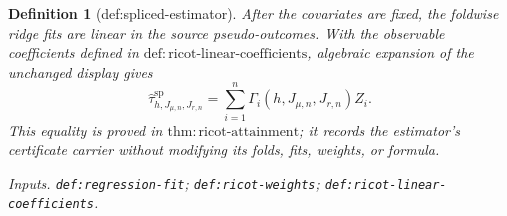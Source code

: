 \documentclass{article}
\newtheorem{definition}{Definition}
\begin{document}
\begin{definition}[def:spliced-estimator]
After the covariates are fixed, the foldwise ridge fits are linear in the source pseudo-outcomes. With the observable coefficients defined in \(\mathrm{def:ricot\text{-}linear\text{-}coefficients}\), algebraic expansion of the unchanged display gives
\[
\widehat\tau^{\mathrm{sp}}_{h,J_{\mu,n},J_{r,n}}=\sum_{i=1}^n\Gamma_i(h,J_{\mu,n},J_{r,n})Z_i.
\]
This equality is proved in \(\mathrm{thm:ricot\text{-}attainment}\); it records the estimator's certificate carrier without modifying its folds, fits, weights, or formula.
\par\smallskip\noindent\emph{Inputs.} \texttt{def:\allowbreak{}regression-\allowbreak{}fit}; \texttt{def:\allowbreak{}ricot-\allowbreak{}weights}; \texttt{def:\allowbreak{}ricot-\allowbreak{}linear-\allowbreak{}coefficients}.
\end{definition}
\end{document}
